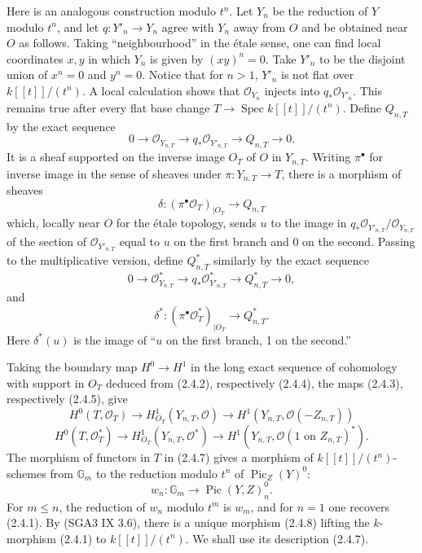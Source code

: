 \documentclass[11pt,leqno]{article}
\DeclareMathOperator{\Spec}{Spec}
\DeclareMathOperator{\Pic}{Pic}
\newcommand{\OO}{\mathcal O}
\newcommand{\GG}{\mathbb G}
\begin{document}
Here is an analogous construction modulo $t^n$. Let $Y_n$ be the reduction of $Y$ modulo $t^n$, and let $q:Y'_n\to Y_n$ agree with $Y_n$ away from $O$ and be obtained near $O$ as follows. Taking ``neighbourhood'' in the étale sense, one can find local coordinates $x,y$ in which $Y_n$ is given by $(xy)^n=0$. Take $Y'_n$ to be the disjoint union of $x^n=0$ and $y^n=0$. Notice that for $n>1$, $Y'_n$ is not flat over $k[[t]]/(t^n)$. A local calculation shows that $\OO_{Y_n}$ injects into $q_*\OO_{Y'_n}$. This remains true after every flat base change $T\to\Spec k[[t]]/(t^n)$. Define $Q_{n,T}$ by the exact sequence
\begin{equation}
        0\longrightarrow\OO_{Y_{n,T}}\longrightarrow q_*\OO_{Y'_{n,T}}\longrightarrow Q_{n,T}\longrightarrow0. \tag{2.4.2}
\end{equation}
It is a sheaf supported on the inverse image $O_T$ of $O$ in $Y_{n,T}$. Writing $\pi^\bullet$ for inverse image in the sense of sheaves under $\pi:Y_{n,T}\to T$, there is a morphism of sheaves
\begin{equation}
        \delta:(\pi^\bullet\OO_T)_{|O_T}\longrightarrow Q_{n,T} \tag{2.4.3}
\end{equation}
which, locally near $O$ for the étale topology, sends $u$ to the image in $q_*\OO_{Y'_{n,T}}/\OO_{Y_{n,T}}$ of the section of $\OO_{Y'_{n,T}}$ equal to $u$ on the first branch and 0 on the second.
\clearpage
Passing to the multiplicative version, define $Q^*_{n,T}$ similarly by the exact sequence
\begin{equation}
        0\longrightarrow\OO^*_{Y_{n,T}}\longrightarrow q_*\OO^*_{Y'_{n,T}}\longrightarrow Q^*_{n,T}\longrightarrow0, \tag{2.4.4}
\end{equation}
and
\begin{equation}
        \delta^*:(\pi^\bullet\OO_T^*)_{|O_T}\longrightarrow Q^*_{n,T}. \tag{2.4.5}
\end{equation}
Here $\delta^*(u)$ is the image of ``$u$ on the first branch, 1 on the second.''

Taking the boundary map $H^0\to H^1$ in the long exact sequence of cohomology with support in $O_T$ deduced from (2.4.2), respectively (2.4.4), the maps (2.4.3), respectively (2.4.5), give
\begin{equation}
        H^0(T,\OO_T)\longrightarrow H^1_{O_T}(Y_{n,T},\OO)\longrightarrow H^1(Y_{n,T},\OO(-Z_{n,T})) \tag{2.4.6}
\end{equation}
\begin{equation}
        H^0(T,\OO_T^*)\longrightarrow H^1_{O_T}(Y_{n,T},\OO^*)\longrightarrow H^1(Y_{n,T},\OO(1\text{ on }Z_{n,T})^*). \tag{2.4.7}
\end{equation}
The morphism of functors in $T$ in (2.4.7) gives a morphism of $k[[t]]/(t^n)$-schemes from $\GG_m$ to the reduction modulo $t^n$ of $\Pic_Z(Y)^0$:
\begin{equation}
        w_n:\GG_m\longrightarrow\Pic(Y,Z)^0_n. \tag{2.4.8}
\end{equation}
For $m\le n$, the reduction of $w_n$ modulo $t^m$ is $w_m$, and for $n=1$ one recovers (2.4.1). By (SGA3 IX 3.6), there is a unique morphism (2.4.8) lifting the $k$-morphism (2.4.1) to $k[[t]]/(t^n)$. We shall use its description (2.4.7).
\end{document}
